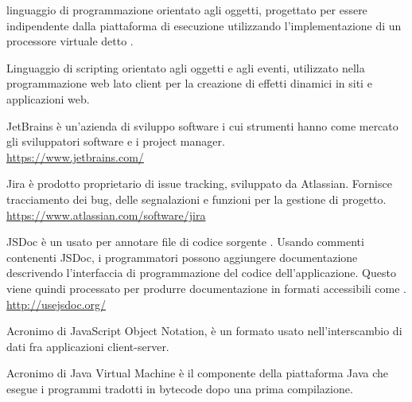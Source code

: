 linguaggio di programmazione orientato agli oggetti, progettato per essere indipendente dalla piattaforma di esecuzione utilizzando l'implementazione di un processore virtuale detto .

Linguaggio di scripting orientato agli oggetti e agli eventi, utilizzato nella programmazione web lato client per la creazione di effetti dinamici in siti e applicazioni web.

JetBrains è un'azienda di sviluppo software i cui strumenti hanno come mercato gli sviluppatori software e i project manager.\\
\url{https://www.jetbrains.com/}

Jira è prodotto proprietario di issue tracking, sviluppato da Atlassian. Fornisce tracciamento dei bug, delle segnalazioni e funzioni per la gestione di progetto.\\
\url{https://www.atlassian.com/software/jira}

JSDoc è un  usato per annotare file di codice sorgente . Usando commenti contenenti JSDoc, i programmatori possono aggiungere documentazione descrivendo l’interfaccia di programmazione del codice dell’applicazione. Questo viene quindi processato per produrre documentazione in formati accessibili come .\\
\url{http://usejsdoc.org/}

Acronimo di JavaScript Object Notation, è un formato usato nell'interscambio di dati fra applicazioni client-server.

Acronimo di Java Virtual Machine è il componente della piattaforma Java che esegue i programmi tradotti in bytecode dopo una prima compilazione.
\clearpage